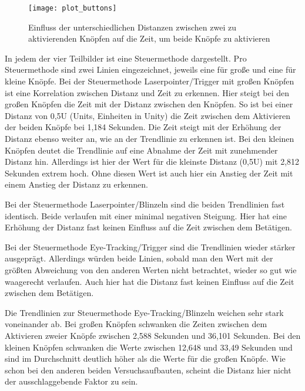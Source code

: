 \begin{figure}[!htbp]
	\centering
	\texttt{[image: plot\_buttons]}
	\caption[Einfluss der unterschiedlichen Distanzen zwischen zwei zu aktivierenden Knöpfen auf die Zeit, um beide Knöpfe zu aktivieren]{Einfluss der unterschiedlichen Distanzen zwischen zwei zu aktivierenden Knöpfen auf die Zeit, um beide Knöpfe zu aktivieren}
	\label{fig:plotbuttons}
\end{figure}
In jedem der vier Teilbilder ist eine Steuermethode dargestellt. Pro Steuermethode sind zwei Linien eingezeichnet, jeweils eine für große und eine für kleine Knöpfe. Bei der Steuermethode Laserpointer/Trigger mit großen Knöpfen ist eine Korrelation zwischen Distanz und Zeit zu erkennen. Hier steigt bei den großen Knöpfen die Zeit mit der Distanz zwischen den Knöpfen. So ist bei einer Distanz von 0,5U (Units, Einheiten in Unity) die Zeit zwischen dem Aktivieren der beiden Knöpfe bei 1,184 Sekunden. Die Zeit steigt mit der Erhöhung der Distanz ebenso weiter an, wie an der Trendlinie zu erkennen ist. Bei den kleinen Knöpfen deutet die Trendlinie auf eine Abnahme der Zeit mit zunehmender Distanz hin. Allerdings ist hier der Wert für die kleinste Distanz (0,5U) mit 2,812 Sekunden extrem hoch. Ohne diesen Wert ist auch hier ein Anstieg der Zeit mit einem Anstieg der Distanz zu erkennen. 

Bei der Steuermethode Laserpointer/Blinzeln sind die beiden Trendlinien fast identisch. Beide verlaufen mit einer minimal negativen Steigung. Hier hat eine Erhöhung der Distanz fast keinen Einfluss auf die Zeit zwischen dem Betätigen.

Bei der Steuermethode Eye-Tracking/Trigger sind die Trendlinien wieder stärker ausgeprägt. Allerdings würden beide Linien, sobald man den Wert mit der größten Abweichung von den anderen Werten nicht betrachtet, wieder so gut wie waagerecht verlaufen. Auch hier hat die Distanz fast keinen Einfluss auf die Zeit zwischen dem Betätigen. 

Die Trendlinien zur Steuermethode Eye-Tracking/Blinzeln weichen sehr stark voneinander ab. Bei großen Knöpfen schwanken die Zeiten zwischen dem Aktivieren zweier Knöpfe zwischen 2,588 Sekunden und 36,101 Sekunden.  Bei den kleinen Knöpfen schwanken die Werte zwischen 12,648 und 33,49 Sekunden und sind im Durchschnitt deutlich höher als die Werte für die großen Knöpfe. Wie schon bei den anderen beiden Versuchsaufbauten, scheint die Distanz hier nicht der ausschlaggebende Faktor zu sein.

